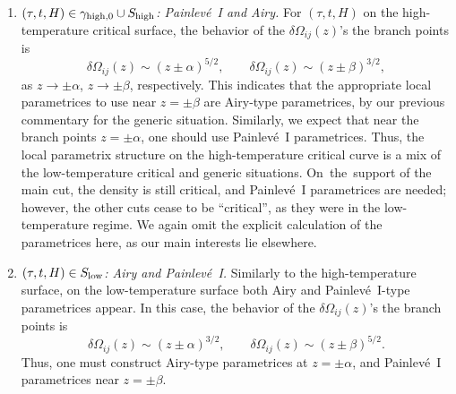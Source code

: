 \documentclass[pdftex]{sigma}
\numberwithin{equation}{section}
\begin{document}
\begin{Remark}
\begin{enumerate}
 \item[$(3)$] \textit{$(\tau,t,H)\in \gamma_{{\rm high},0} \cup S_{{\rm high}}$: Painlev\'{e}~I and Airy.}
 For $(\tau,t,H)$ on the high-temperature critical surface, the behavior of the $\delta \Omega_{ij}(z)$'s the branch points is
 \begin{equation*}
 \delta \Omega_{ij}(z) \sim (z\pm \alpha)^{5/2}, \qquad \delta \Omega_{ij}(z) \sim (z\pm \beta)^{3/2},
 \end{equation*}
 as $z\to \pm \alpha$, $z\to \pm \beta$, respectively. This indicates that the appropriate local
 parametrices to use near $z=\pm \beta$ are Airy-type parametrices, by our previous commentary for the generic situation. Similarly, we expect that near
 the branch points $z=\pm \alpha$, one should use Painlev\'{e}~I parametrices. Thus, the local parametrix structure on the high-temperature critical curve
 is a mix of the low-temperature critical and generic situations. On~the~support of the main cut, the density is still critical, and Painlev\'{e}~I
 parametrices are needed; however, the other cuts cease to be ``critical'', as they were in the low-temperature regime.
 We again omit the explicit calculation of the parametrices here, as our main interests lie elsewhere.

 \item[$(4)$] \textit{$(\tau,t,H)\in S_{{\rm low}}$: Airy and Painlev\'{e}~I.}
 Similarly to the high-temperature surface, on the low-temperature surface both Airy and Painlev\'{e}~I-type parametrices appear. In this case, the behavior of the $\delta \Omega_{ij}(z)$'s the branch points is
 \begin{equation*}
 \delta \Omega_{ij}(z) \sim (z\pm \alpha)^{3/2}, \qquad \delta \Omega_{ij}(z) \sim (z\pm \beta)^{5/2}.
 \end{equation*}
 Thus, one must construct Airy-type parametrices at $z=\pm \alpha$, and Painlev\'{e}~I parametrices near
 $z=\pm\beta$.


\end{enumerate}
\end{Remark}
\end{document}
